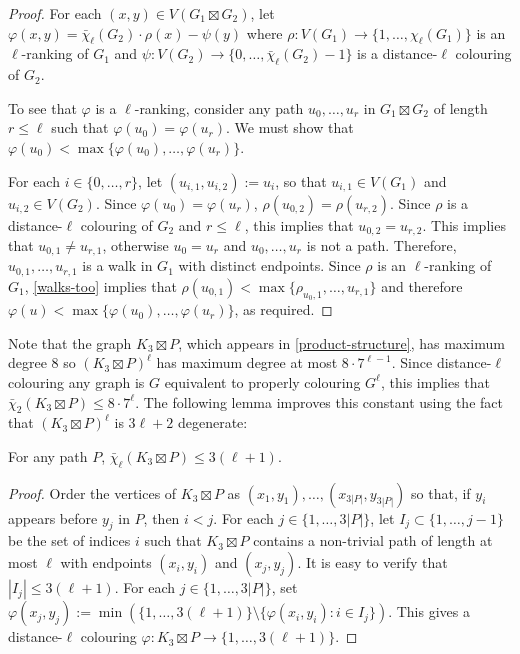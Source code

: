 \documentclass[kpfonts]{patmorin}
\newcommand{\lrn}{\chi_{\ell}}
\newcommand{\dtcn}{\bar{\chi}_2}
\newcommand{\dlcn}{\bar{\chi}_\ell}
\theoremstyle{named}
\begin{document}
\begin{proof}
    For each $(x,y)\in V(G_1\boxtimes G_2)$, let $\varphi(x,y)=\dlcn(G_2)\cdot \rho(x) - \psi(y)$ where $\rho:V(G_1)\to\{1,\ldots,\lrn(G_1)\}$ is an $\ell$-ranking of $G_1$ and $\psi:V(G_2)\to\{0,\ldots,\dlcn(G_2)-1\}$ is a distance-$\ell$ colouring of $G_2$.

    To see that $\varphi$ is a $\ell$-ranking, consider any
    path $u_0,\ldots,u_r$ in $G_1\boxtimes G_2$ of length $r\le\ell$ such that $\varphi(u_0)=\varphi(u_r)$.  We must show that $\varphi(u_0)<\max\{\varphi(u_0),\ldots,\varphi(u_r)\}$.

    For each $i\in\{0,\ldots,r\}$, let $(u_{i,1},u_{i,2}):=u_i$, so that $u_{i,1}\in V(G_1)$ and $u_{i,2}\in V(G_2)$. Since $\varphi(u_0)=\varphi(u_r)$, $\rho(u_{0,2})=\rho(u_{r,2})$. Since $\rho$ is a distance-$\ell$ colouring of $G_2$ and $r\le\ell$, this implies that $u_{0,2}=u_{r,2}$.  This implies that $u_{0,1}\neq u_{r,1}$, otherwise $u_0=u_r$ and $u_0,\ldots,u_r$ is not a path.  Therefore, $u_{0,1},\ldots,u_{r,1}$ is a walk in $G_1$ with distinct endpoints.
    Since $\rho$ is an $\ell$-ranking of $G_1$, \cref{walks-too} implies that $\rho(u_{0,1})<\max\{\rho_{u_0,1},\ldots,u_{r,1}\}$ and therefore $\varphi(u)<\max\{\varphi(u_0),\ldots,\varphi(u_r)\}$, as required.
\end{proof}

Note that the graph $K_3\boxtimes P$, which appears in \cref{product-structure}, has maximum degree 8 so $(K_3\boxtimes P)^\ell$ has maximum degree at most $8\cdot 7^{\ell-1}$.  Since distance-$\ell$ colouring any graph is $G$ equivalent to properly colouring $G^{\ell}$, this implies that $\dtcn(K_3\boxtimes P)\le 8\cdot7^\ell$. The following lemma improves this constant using the fact that $(K_3\boxtimes P)^\ell$ is $3\ell+2$ degenerate:

\begin{lem}\label{dumb}
    For any path $P$, $\dlcn(K_3\boxtimes P)\le 3(\ell+1)$.
\end{lem}

\begin{proof}
    Order the vertices of $K_3\boxtimes P$ as $(x_1,y_1),\ldots,(x_{3|P|},y_{3|P|})$ so that, if $y_i$ appears before $y_j$ in $P$, then $i<j$. For each $j\in\{1,\ldots,3|P|\}$, let $I_j\subset\{1,\ldots,j-1\}$ be the set of indices $i$ such that $K_3\boxtimes P$ contains a non-trivial path of length at most $\ell$ with endpoints $(x_i,y_i)$ and $(x_j,y_j)$.  It is easy to verify that $|I_j|\le 3(\ell+1)$.  For each $j\in\{1,\ldots,3|P|\}$, set $\varphi(x_j,y_j):=\min(\{1,\ldots,3(\ell+1)\}\setminus\{\varphi(x_i,y_i):i\in I_j\})$.  This gives a distance-$\ell$ colouring $\varphi:K_3\boxtimes P\to\{1,\ldots,3(\ell+1)\}$.
\end{proof}
\end{document}
